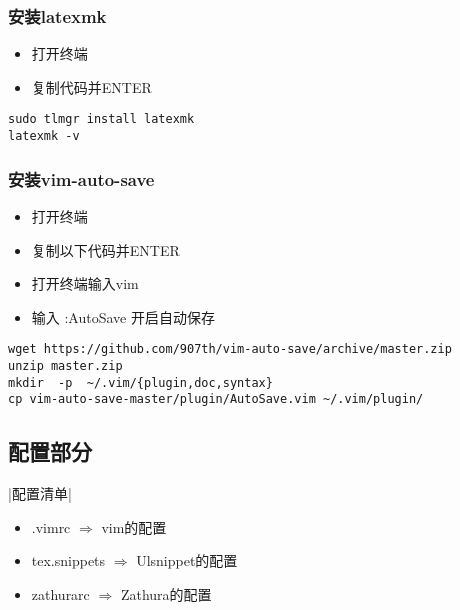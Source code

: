 \documentclass[UTF_8]{ctexart}
\begin{document}
\subsubsection{安装latexmk}
\begin{itemize}
		\item 打开终端
		\item 复制代码并ENTER
		
\end{itemize}
\begin{lstlisting}[frame=shadowbox]
sudo tlmgr install latexmk 
latexmk -v
\end{lstlisting}
\small
\heiti
{}

\subsubsection{安装vim-auto-save}
\begin{itemize}
		\item 打开终端
		\item 复制以下代码并ENTER
		\item 打开终端输入vim 
		\item 输入 :AutoSave 开启自动保存
\end{itemize}
\begin{lstlisting}[frame=shadowbox]
wget https://github.com/907th/vim-auto-save/archive/master.zip
unzip master.zip
mkdir  -p  ~/.vim/{plugin,doc,syntax}
cp vim-auto-save-master/plugin/AutoSave.vim ~/.vim/plugin/
\end{lstlisting}


\clearpage
\subsection{配置部分}
\centerline{|配置清单|}
\begin{itemize}
		\item .vimrc $\Rightarrow$ vim的配置
		\item tex.snippets $\Rightarrow$ Ulsnippet的配置
		\item zathurarc $\Rightarrow$ Zathura的配置
		
\end{itemize}

\end{document}
